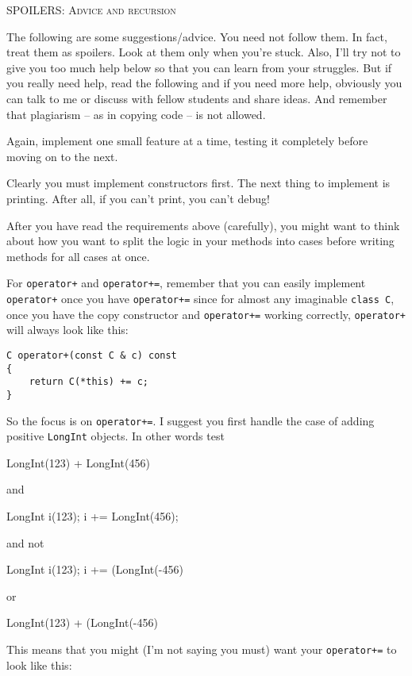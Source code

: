 \textsc{SPOILERS: Advice and recursion}

The following are some suggestions/advice. You need not follow 
them. In fact, treat them as spoilers. Look at them only when 
you're stuck. Also, I'll try not to give you too much help below 
so that you can learn from your struggles. But if you really need 
help, read the following and if you need more help, obviously you 
can talk to me or discuss with fellow students and share ideas. 
And remember that plagiarism – as in copying code – is not allowed. 

Again, implement one small feature at a time, testing it completely 
before moving on to the next.

Clearly you must implement constructors first. The next thing to 
implement is printing. After all, if you can't print, you can't debug!

After you have read the requirements above (carefully), 
you might want to think about how you want to split the logic in your methods
into cases before writing methods for all cases at once.


For \verb!operator+! and \verb!operator+=!, remember that you can easily 
implement \verb!operator+! once you have \verb!operator+=! since for 
almost any imaginable \verb!class C!, once you have the copy constructor 
and \verb!operator+=! working correctly, \verb!operator+! will always 
look like this:

\begin{Verbatim}[frame=single,fontsize=\footnotesize]
C operator+(const C & c) const
{
    return C(*this) += c;
}
\end{Verbatim}

So the focus is on \verb!operator+=!. I suggest you first handle the case 
of adding positive \verb!LongInt! objects. In other words test 
\begin{console}[fontsize=\footnotesize]
LongInt(123) + LongInt(456)
\end{console}
and
\begin{console}[fontsize=\footnotesize]
LongInt i(123);
i += LongInt(456); 
\end{console}
and not 
\begin{console}[fontsize=\footnotesize]
LongInt i(123);
i += (LongInt(-456)
\end{console}
or
\begin{console}[fontsize=\footnotesize]
LongInt(123) + (LongInt(-456)
\end{console}

This means that you might (I'm not 
saying you must) want your \verb!operator+=! to look like this:

